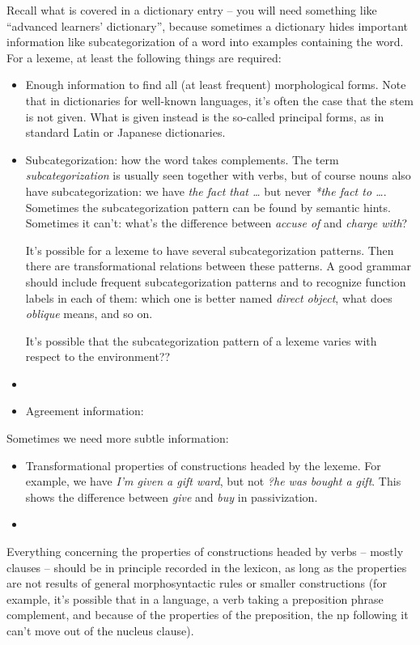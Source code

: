 \documentclass[UTF8, a4paper, oneside, scheme=plain]{ctexart}
\newcommand*{\term}[1]{\emph{#1}}
\newcommand*{\corpus}[1]{\emph{#1}}
\begin{document}
Recall what is covered in a dictionary entry
-- you will need something like ``advanced learners' dictionary'',
because sometimes a dictionary hides important information like subcategorization of a word 
into examples containing the word.
For a lexeme, at least the following things are required:
\begin{itemize}
    \item Enough information to find all (at least frequent) morphological forms.
    Note that in dictionaries for well-known languages,
    it's often the case that 
    the stem is not given.
    What is given instead is the so-called principal forms,
    as in standard Latin or Japanese dictionaries.
    \item Subcategorization: how the word takes complements.
    The term \term{subcategorization} is usually seen together with verbs,
    but of course nouns also have subcategorization: 
    we have \corpus{the fact that \dots} but never 
    \corpus{*the fact to \dots}.
    Sometimes the subcategorization pattern can be found by semantic hints.
    Sometimes it can't: 
    what's the difference between \corpus{accuse of} and \corpus{charge with}?

    It's possible for a lexeme to have several subcategorization patterns.
    Then there are transformational relations between these patterns.
    A good grammar should include frequent subcategorization patterns
    and to recognize function labels in each of them:
    which one is better named \term{direct object},
    what does \corpus{oblique} means, 
    and so on.

    It's possible that the subcategorization pattern of a lexeme 
    varies with respect to the environment?? %

    \item 
    \item Agreement information: 
\end{itemize}
Sometimes we need more subtle information:
\begin{itemize}
    \item Transformational properties of constructions headed by the lexeme.
    For example, we have 
    \corpus{I'm given a gift ward},
    but not \corpus{?he was bought a gift}.
    This shows the difference between \corpus{give} and \corpus{buy} 
    in passivization.
    \item 
\end{itemize}

Everything concerning the properties of constructions headed by verbs -- mostly clauses --
should be in principle recorded in the lexicon,
as long as the properties are not results of general morphosyntactic rules 
or smaller constructions
(for example, it's possible that in a language,
a verb taking a preposition phrase complement,
and because of the properties of the preposition,
the \ac{np} following it can't move out of the nucleus clause).
\end{document}

